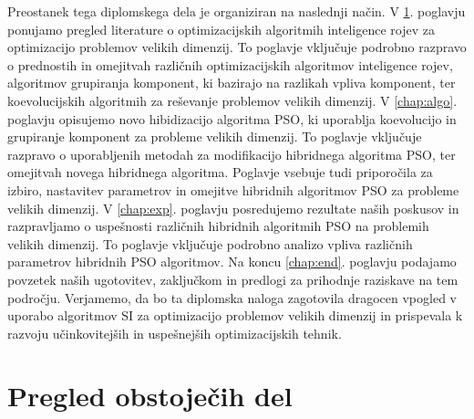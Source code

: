Preostanek tega diplomskega dela je organiziran na naslednji način.
V \ref{chap:obsojeca.dela}. poglavju ponujamo pregled literature o optimizacijskih algoritmih inteligence rojev za optimizacijo problemov velikih dimenzij.
To poglavje vključuje podrobno razpravo o prednostih in omejitvah različnih optimizacijskih algoritmov inteligence rojev, algoritmov grupiranja komponent, ki bazirajo na razlikah vpliva komponent, ter koevolucijskih algoritmih za reševanje problemov velikih dimenzij.
V \ref{chap:algo}. poglavju opisujemo novo hibidizacijo algoritma PSO, ki uporablja koevolucijo in grupiranje komponent za probleme velikih dimenzij.
To poglavje vključuje razpravo o uporabljenih metodah za modifikacijo hibridnega algoritma PSO, ter omejitvah novega hibridnega algoritma.
Poglavje vsebuje tudi priporočila za izbiro, nastavitev parametrov in omejitve hibridnih algoritmov PSO za probleme velikih dimenzij.
V \ref{chap:exp}. poglavju posredujemo rezultate naših poskusov in razpravljamo o uspešnosti različnih hibridnih algoritmih PSO na problemih velikih dimenzij.
To poglavje vključuje podrobno analizo vpliva različnih parametrov hibridnih PSO algoritmov.
Na koncu \ref{chap:end}. poglavju podajamo povzetek naših ugotovitev, zaključkom in predlogi za prihodnje raziskave na tem področju. Verjamemo, da bo ta diplomska naloga zagotovila dragocen vpogled v uporabo algoritmov SI za optimizacijo problemov velikih dimenzij in prispevala k razvoju učinkovitejših in uspešnejših optimizacijskih tehnik.

\chapter{Pregled obstoječih del}\label{chap:obsojeca.dela}

